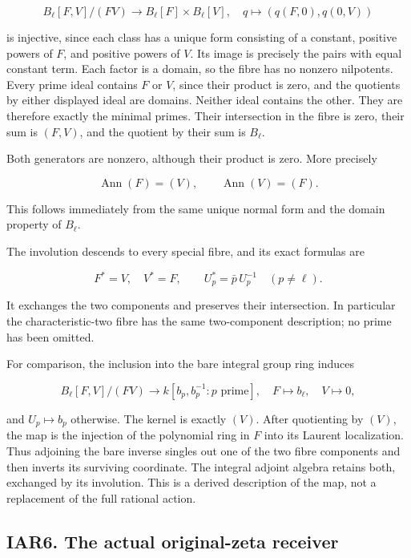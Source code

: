 \documentclass[
]{article}
\begin{document}
\[
B_\ell[F,V]/(FV)\longrightarrow B_\ell[F]\times B_\ell[V],
\quad q\longmapsto(q(F,0),q(0,V))
\tag{IAR5.3}
\]

is injective, since each class has a unique form consisting of a
constant, positive powers of \(F\), and positive powers of \(V\). Its
image is precisely the pairs with equal constant term. Each factor is a
domain, so the fibre has no nonzero nilpotents. Every prime ideal
contains \(F\) or \(V\), since their product is zero, and the quotients
by either displayed ideal are domains. Neither ideal contains the other.
They are therefore exactly the minimal primes. Their intersection in the
fibre is zero, their sum is \((F,V)\), and the quotient by their sum is
\(B_\ell\).

Both generators are nonzero, although their product is zero. More
precisely

\[
\operatorname{Ann}(F)=(V),\qquad
\operatorname{Ann}(V)=(F).
\tag{IAR5.4}
\]

This follows immediately from the same unique normal form and the domain
property of \(B_\ell\).

The involution descends to every special fibre, and its exact formulas
are

\[
F^*=V,\quad V^*=F,
\qquad U_p^*=\bar p\,U_p^{-1}\quad(p\ne\ell).
\tag{IAR5.5}
\]

It exchanges the two components and preserves their intersection. In
particular the characteristic-two fibre has the same two-component
description; no prime has been omitted.

For comparison, the inclusion into the bare integral group ring induces

\[
B_\ell[F,V]/(FV)\longrightarrow
k[b_p,b_p^{-1}:p\text{ prime}],
\quad F\longmapsto b_\ell,\quad V\longmapsto0,
\tag{IAR5.6}
\]

and \(U_p\mapsto b_p\) otherwise. The kernel is exactly \((V)\). After
quotienting by \((V)\), the map is the injection of the polynomial ring
in \(F\) into its Laurent localization. Thus adjoining the bare inverse
singles out one of the two fibre components and then inverts its
surviving coordinate. The integral adjoint algebra retains both,
exchanged by its involution. This is a derived description of the map,
not a replacement of the full rational action.

\subsection{IAR6. The actual original-zeta
receiver}\label{iar6.-the-actual-original-zeta-receiver}
\end{document}
